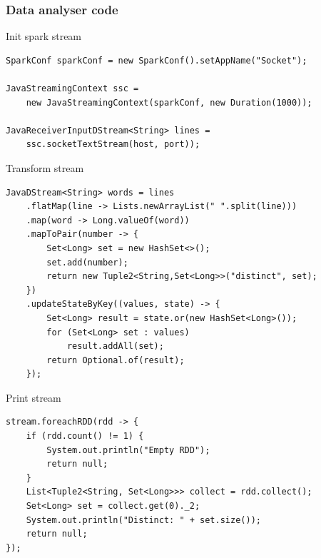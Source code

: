 \documentclass{beamer}
\begin{document}
\begin{frame}
\frametitle{Data analyser code}
\begin{block}{Init spark stream}
\begin{lstlisting}
SparkConf sparkConf = new SparkConf().setAppName("Socket");

JavaStreamingContext ssc = 
    new JavaStreamingContext(sparkConf, new Duration(1000));
    
JavaReceiverInputDStream<String> lines = 
    ssc.socketTextStream(host, port));
\end{lstlisting}
\end{block}

\begin{block}{Transform stream}
\begin{lstlisting}
JavaDStream<String> words = lines
    .flatMap(line -> Lists.newArrayList(" ".split(line)))
    .map(word -> Long.valueOf(word))
    .mapToPair(number -> {
        Set<Long> set = new HashSet<>();
        set.add(number);
        return new Tuple2<String,Set<Long>>("distinct", set);
    })
    .updateStateByKey((values, state) -> {
        Set<Long> result = state.or(new HashSet<Long>());
        for (Set<Long> set : values)
            result.addAll(set);
        return Optional.of(result);
    });
\end{lstlisting}
\end{block}

\begin{block}{Print stream}
\begin{lstlisting}
stream.foreachRDD(rdd -> {
    if (rdd.count() != 1) {
        System.out.println("Empty RDD");
        return null;
    }
    List<Tuple2<String, Set<Long>>> collect = rdd.collect();
    Set<Long> set = collect.get(0)._2;
    System.out.println("Distinct: " + set.size());
    return null;
});
\end{lstlisting}
\end{block}

\end{frame}
\end{document}
